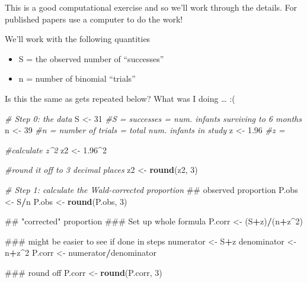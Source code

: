\documentclass[]{book}
\newenvironment{Shaded}{\begin{snugshade}}{\end{snugshade}}
\newcommand{\KeywordTok}[1]{\textcolor[rgb]{0.13,0.29,0.53}{\textbf{#1}}}
\newcommand{\DecValTok}[1]{\textcolor[rgb]{0.00,0.00,0.81}{#1}}
\newcommand{\FloatTok}[1]{\textcolor[rgb]{0.00,0.00,0.81}{#1}}
\newcommand{\StringTok}[1]{\textcolor[rgb]{0.31,0.60,0.02}{#1}}
\newcommand{\CommentTok}[1]{\textcolor[rgb]{0.56,0.35,0.01}{\textit{#1}}}
\newcommand{\OperatorTok}[1]{\textcolor[rgb]{0.81,0.36,0.00}{\textbf{#1}}}
\newcommand{\NormalTok}[1]{#1}
\providecommand{\tightlist}{%
  \setlength{\itemsep}{0pt}\setlength{\parskip}{0pt}}
\theoremstyle{definition}
\theoremstyle{definition}
\theoremstyle{definition}
\theoremstyle{remark}
\begin{document}
This is a good computational exercise and so we'll work through the
details. For published papers use a computer to do the work!

We'll work with the following quantities

\begin{itemize}
\tightlist
\item
  S = the observed number of ``successes''
\item
  n = number of binomial ``trials''
\end{itemize}

Is this the same as gets repeated below? What was I doing \ldots{} :(

\begin{Shaded}
\begin{Highlighting}[]
\CommentTok{# Step 0: the data}
\NormalTok{S <-}\StringTok{ }\DecValTok{31}   \CommentTok{#S = successes = num. infants surviving to 6 months}
\NormalTok{n <-}\StringTok{ }\DecValTok{39}   \CommentTok{#n = number of trials = total num. infants in study}
\NormalTok{z <-}\StringTok{ }\FloatTok{1.96} \CommentTok{#z = }

\CommentTok{#calculate z^2}
\NormalTok{z2 <-}\StringTok{ }\FloatTok{1.96}\OperatorTok{^}\DecValTok{2}

\CommentTok{#round it off to 3 decimal places}
\NormalTok{z2 <-}\StringTok{ }\KeywordTok{round}\NormalTok{(z2, }\DecValTok{3}\NormalTok{)}

\CommentTok{# Step 1: calculate the Wald-corrected proportion}
\NormalTok{## observed proportion}
\NormalTok{P.obs  <-}\StringTok{ }\NormalTok{S}\OperatorTok{/}\NormalTok{n}
\NormalTok{P.obs  <-}\StringTok{  }\KeywordTok{round}\NormalTok{(P.obs, }\DecValTok{3}\NormalTok{)           }

\NormalTok{## "corrected" proportion}
\NormalTok{### Set up whole formula}
\NormalTok{P.corr <-}\StringTok{  }\NormalTok{(S}\OperatorTok{+}\NormalTok{z)}\OperatorTok{/}\NormalTok{(n}\OperatorTok{+}\NormalTok{z}\OperatorTok{^}\DecValTok{2}\NormalTok{)}

\NormalTok{### might be easier to see if done in steps}
\NormalTok{numerator <-}\StringTok{ }\NormalTok{S}\OperatorTok{+}\NormalTok{z}
\NormalTok{denominator <-}\StringTok{ }\NormalTok{n}\OperatorTok{+}\NormalTok{z}\OperatorTok{^}\DecValTok{2}
\NormalTok{P.corr <-}\StringTok{ }\NormalTok{numerator}\OperatorTok{/}\NormalTok{denominator}

\NormalTok{### round off}
\NormalTok{P.corr <-}\StringTok{ }\KeywordTok{round}\NormalTok{(P.corr, }\DecValTok{3}\NormalTok{)}


\end{Highlighting}
\end{Shaded}
\end{document}
